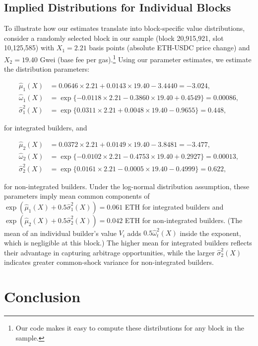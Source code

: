 \documentclass[12pt,reqno]{amsart}
\begin{document}
\subsection{Implied Distributions for Individual Blocks}

To illustrate how our estimates translate into block-specific value distributions, consider a randomly selected block in our sample (block 20,915,921, slot 10,125,585) with $X_1 = 2.21$ basis points (absolute ETH-USDC price change) and $X_2 = 19.40$ Gwei (base fee per gas).\footnote{Our code makes it easy to compute these distributions for any block in the sample.} Using our parameter estimates, we estimate the distribution parameters:

\begin{align*}
\hat{\mu}_1(X) &= 0.0646 \times 2.21 + 0.0143 \times 19.40 - 3.4440 = -3.024,\\
\hat{\omega}_1(X) &= \exp\{-0.0118 \times 2.21 - 0.3860 \times 19.40 + 0.4549\} = 0.00086,\\
\hat{\sigma}_1^2(X) &= \exp\{0.0311 \times 2.21 + 0.0048 \times 19.40 - 0.9655\} = 0.448,
\end{align*}

for integrated builders, and

\begin{align*}
\hat{\mu}_2(X) &= 0.0372 \times 2.21 + 0.0149 \times 19.40 - 3.8481 = -3.477,\\
\hat{\omega}_2(X) &= \exp\{-0.0102 \times 2.21 - 0.4753 \times 19.40 + 0.2927\} = 0.00013,\\
\hat{\sigma}_2^2(X) &= \exp\{0.0161 \times 2.21 - 0.0005 \times 19.40 - 0.4999\} = 0.622,
\end{align*}

for non-integrated builders. Under the log-normal distribution assumption, these parameters imply mean common components of $\exp(\hat{\mu}_1(X) + 0.5\hat{\sigma}_1^2(X)) = 0.061$ ETH for integrated builders and $\exp(\hat{\mu}_2(X) + 0.5\hat{\sigma}_2^2(X)) = 0.042$ ETH for non-integrated builders. (The mean of an individual builder's value $V_i$ adds $0.5\hat{\omega}_t^2(X)$ inside the exponent, which is negligible at this block.) The higher mean for integrated builders reflects their advantage in capturing arbitrage opportunities, while the larger $\hat{\sigma}_2^2(X)$ indicates greater common-shock variance for non-integrated builders.


\section{Conclusion} \label{sec:conclusion}
\end{document}
